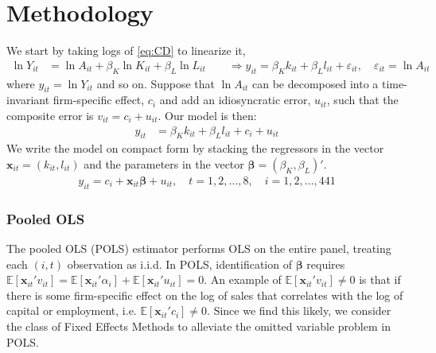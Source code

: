 \section{Methodology} \label{sec:methodology}

We start by taking logs of \eqref{eq:CD} to linearize it,
\begin{align*}
    \ln Y_{it} &= \ln A_{it} + \beta_K \ln K_{it} + \beta_L \ln L_{it} \qquad \Rightarrow
    y_{it} = \beta_K k_{it} + \beta_L l_{it} + \varepsilon_{it}, \quad \varepsilon_{it} = \ln A_{it}
\end{align*}
where $y_{it} = \ln Y_{it}$ and so on. Suppose that $\ln A_{it}$ can be decomposed into a time-invariant firm-specific effect, $c_i$ and add an idiosyncratic error, $u_{it}$, such that the composite error is $v_{it} = c_i + u_{it}$. Our model is then:
\begin{align*}
    y_{it} &= \beta_K k_{it} + \beta_L l_{it}+c_i + u_{it}
\end{align*}
We write the model on compact form by stacking the regressors in the vector $\bm{x}_{it} = (k_{it}, l_{it})$ and the parameters in the vector $\bm{\beta} = (\beta_K, \beta_L)'$.
\begin{align}
    y_{it} = c_i + \bm{x}_{it} \bm{\beta} + u_{it}, \quad t=1,2,\ldots,8, \quad i=1,2,\ldots,441
    \label{equationline}
\end{align}

\subsubsection*{Pooled OLS}
The pooled OLS (POLS) estimator performs OLS on the entire panel, treating each $(i,t)$ observation as i.i.d. In POLS, identification of $\pmb{\beta}$ requires  $\mathbb{E}[\pmb{x}_{it}'v_{it}]=\mathbb{E}[\pmb{x}_{it}'\alpha_{i}]+\mathbb{E}[\pmb{x}_{it}'u_{it}]=0$.
An example of $\mathbb{E}[\pmb{x}_{it}'v_{it}]\neq0$ is that if there is some firm-specific effect on the log of sales that correlates with the log of capital or employment, i.e. $\mathbb{E}[\pmb{x}_{it}'c_{i}]\neq0$. Since we find this likely, we consider the class of Fixed Effects Methods to alleviate the omitted variable problem in POLS.

